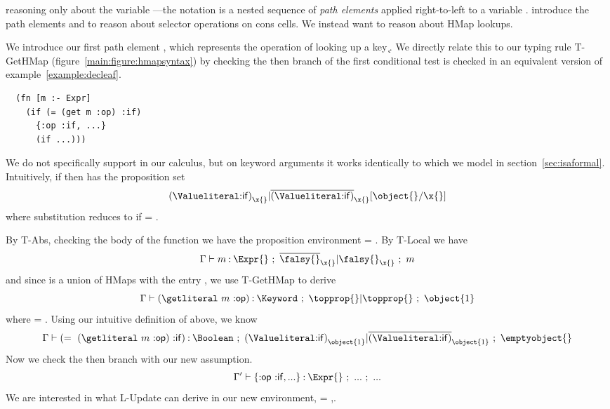 reasoning only about the variable \x{}---the notation \pathelem{} is a nested sequence of \emph{path elements}
applied right-to-left to a variable \x{}.
\citet{TF10} introduce the path elements \carpe{} and \cdrpe{}
to reason about selector operations on cons cells.
We instead want to reason about HMap lookups.

We introduce our first path element
{\keype{\k{}}}, which represents the operation of looking up
a key \k{}.
We directly relate this to our typing rule T-GetHMap
(figure~\ref{main:figure:hmapsyntax}) by
checking the then branch of the first conditional test is checked in 
an equivalent version of example~\ref{example:decleaf}.
\begin{verbatim}
  (fn [m :- Expr]
    (if (= (get m :op) :if)
      {:op :if, ...}
      (if ...)))
\end{verbatim}

We do not specifically support \equivliteral{} in our calculus, 
but on keyword arguments it works identically to  which we model
in section~\ref{sec:isaformal}.
Intuitively, if {\judgement{\propenv{}}{\hastype{\e{}}{\t{}}}{\filterset{\thenprop{\prop{}}}{\elseprop{\prop{}}}}{\object{}}}
then  has the proposition set 
$$
{\replacefor{\filterset{\isprop{\Value{\makekw{if}}}{\x{}}}{\notprop{\Value{\makekw{if}}}{\x{}}}}{\object{}}{\x{}}}
$$
where substitution reduces to \topprop{} if \object{} = \emptyobject{}.

By T-Abs, checking the body of the function we have the proposition environment \propenv{} = {}.
By T-Local we have
$$
\judgement{\propenv{}}{\hastype{m}{\Expr{}}}{\filterset{\notprop{\falsy{}}{\x{}}}{\isprop{\falsy{}}{\x{}}}}{m}
$$
and since {\Expr{}} is a union of HMaps with the entry , we use T-GetHMap to derive
$$
\judgement{\propenv{}}{\hastype{\getexp{m}{\makekw{op}}}{\Keyword}}{\filterset{\topprop{}}{\topprop{}}}{\object{1}}
$$
where  = {}. Using our intuitive definition of \equivliteral{} above, we know
$$
\judgement{\propenv{}}{\hastype{\equivapp{\getexp{m}{\makekw{op}}}{\makekw{if}}}{\Boolean}}{\filterset{\isprop{\Value{\makekw{if}}}{\object{1}}}{\notprop{\Value{\makekw{if}}}{\object{1}}}}{\emptyobject{}}
$$
Now we check the then branch with our new assumption.
$$
\judgement{\propenvp{}}{\hastype{\curlymap{{\mapvalentrykwkeynoarrow{op}{\makekw{if}}}, ...}}{\Expr{}}}{...}{...}
$$
We are interested in what L-Update can derive in our new environment,
\propenvp{} = {},{}.

